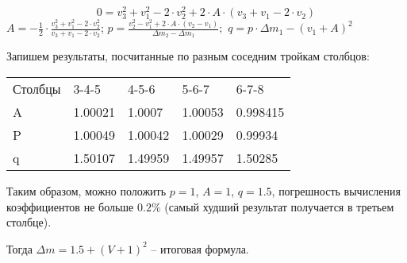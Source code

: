 $$0=v_3^2+v_1^2-2 \cdot v_2^2+2 \cdot A \cdot (v_3+v_1-2 \cdot v_2 )  $$
$A=-\frac{1}{2} \cdot \frac{v_3^2+v_1^2-2 \cdot v_2^2}{v_3+v_1-2 \cdot v_2}$; 
$p=\frac{v_2^2-v_1^2+2 \cdot A \cdot (v_2-v_1 )}{\Delta m_2-\Delta m_1};$ $q=p \cdot \Delta m_1-(v_1+A)^2 $

Запишем результаты, посчитанные по разным соседним тройкам столбцов:

\begin{tabular}{l l l l l}
    Столбцы & 3-4-5 & 4-5-6	& 5-6-7	& 6-7-8 \\
    A &	1.00021 & 1.0007 &	1.00053 &	0.998415 \\
    P &	1.00049 &	1.00042 &	1.00029 &	0.99934 \\
    q & 	1.50107 &	1.49959 &	1.49957 &	1.50285
\end{tabular}

Таким образом, можно положить $p = 1$, $A = 1$, $q = 1.5$, погрешность вычисления коэффициентов не 
больше $0.2 \%$ (самый худший результат получается в третьем столбце). 

Тогда $\Delta m=1.5+(V+1)^2$ – итоговая формула. 


